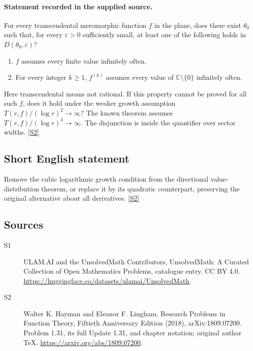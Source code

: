 \documentclass[11pt]{article}
\newcommand{\sref}[2]{\hyperlink{source:#1:#2}{[S#2]}}
\begin{document}
\paragraph{Statement recorded in the supplied source.}
For every transcendental meromorphic function $f$ in the plane, does there exist $\theta_0$ such that, for every $\varepsilon>0$ sufficiently small, at least one of the following holds in $D(\theta_0,\varepsilon)$?
\begin{enumerate}
\item $f$ assumes every finite value infinitely often.
\item For every integer $k\ge1$, $f^{(k)}$ assumes every value of $\mathbb C\setminus\{0\}$ infinitely often.
\end{enumerate}
Here transcendental means not rational. If this property cannot be proved for all such $f$, does it hold under the weaker growth assumption $T(r,f)/(\log r)^2\to\infty$? The known theorem assumes $T(r,f)/(\log r)^3\to\infty$. The disjunction is inside the quantifier over sector widths. \sref{statement}{2}
\subsection{Short English statement}
Remove the cubic logarithmic growth condition from the directional value-distribution theorem, or replace it by its quadratic counterpart, preserving the original alternative about all derivatives. \sref{statement}{2}
\subsection{Sources}
\begin{description}
\item[\hypertarget{source:statement:1}{S1}] ULAM.AI and the UnsolvedMath Contributors, UnsolvedMath: A Curated Collection of Open Mathematics Problems, catalogue entry. CC BY 4.0. \url{https://huggingface.co/datasets/ulamai/UnsolvedMath}.
\item[\hypertarget{source:statement:2}{S2}] Walter K. Hayman and Eleanor F. Lingham, Research Problems in Function Theory, Fiftieth Anniversary Edition (2018), arXiv:1809.07200. Problem 1.31, its full Update 1.31, and chapter notation; original author TeX. \url{https://arxiv.org/abs/1809.07200}.
\end{description}
\label{end:statement}
\end{document}
